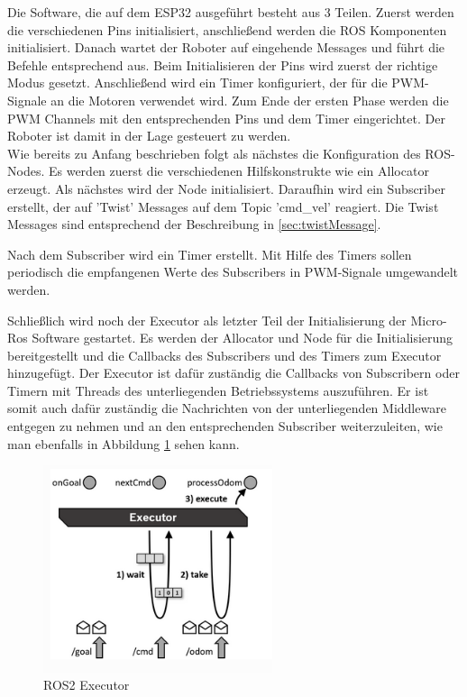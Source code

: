 \begin{flushleft}
    Die Software, die auf dem ESP32 ausgeführt besteht aus 3 Teilen. Zuerst werden die verschiedenen Pins initialisiert, anschließend werden die ROS Komponenten initialisiert. Danach wartet der Roboter auf eingehende Messages und führt die Befehle entsprechend aus.
    Beim Initialisieren der Pins wird zuerst der richtige Modus gesetzt. Anschließend wird ein Timer konfiguriert, der für die PWM-Signale an die Motoren verwendet wird.
    Zum Ende der ersten Phase werden die PWM Channels mit den entsprechenden Pins und dem Timer eingerichtet.
    Der Roboter ist damit in der Lage gesteuert zu werden.\\

    Wie bereits zu Anfang beschrieben folgt als nächstes die Konfiguration des ROS-Nodes.
    Es werden zuerst die verschiedenen Hilfskonstrukte wie ein Allocator erzeugt. Als nächstes wird der Node initialisiert.
    Daraufhin wird ein Subscriber erstellt, der auf 'Twist' Messages auf dem Topic 'cmd\_vel' reagiert. 
    Die Twist Messages sind entsprechend der Beschreibung in \ref{sec:twistMessage}. \newline


    Nach dem Subscriber wird ein Timer erstellt. Mit Hilfe des Timers sollen periodisch die empfangenen Werte des Subscribers in PWM-Signale umgewandelt werden.
    
    Schließlich wird noch der Executor als letzter Teil der Initialisierung der Micro-Ros Software gestartet.
    Es werden der Allocator und Node für die Initialisierung bereitgestellt und die Callbacks des Subscribers und des Timers zum Executor hinzugefügt.
    Der Executor ist dafür zuständig die Callbacks von Subscribern oder Timern mit Threads des unterliegenden Betriebssystems auszuführen.
    Er ist somit auch dafür zuständig die Nachrichten von der unterliegenden Middleware entgegen zu nehmen und an den entsprechenden Subscriber weiterzuleiten, wie man ebenfalls in Abbildung \ref{fig:ros2_executor} sehen kann.\\

    \begin{figure}[h!]
        \centering
        \includegraphics[width=0.6\textwidth]{imgs/ROS2_executor.png}
        \caption{ROS2 Executor}
        \label{fig:ros2_executor}%
    \end{figure}


\end{flushleft}
